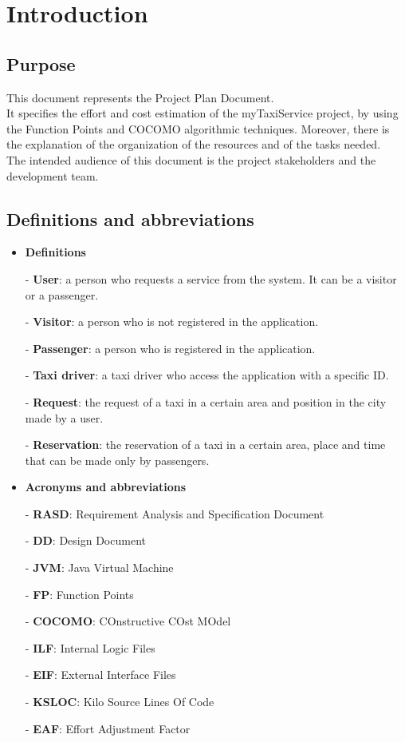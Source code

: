 \newpage
\section{Introduction}
	\subsection{Purpose}
		This document represents the Project Plan Document.\\ It specifies the effort and cost estimation of the myTaxiService project, by using the Function Points and COCOMO algorithmic techniques. Moreover, there is the explanation of the organization of the resources and of the tasks needed.\\
		The intended audience of this document is the project stakeholders and the development team.
	\subsection{Definitions and abbreviations}
		\begin{itemize}
			\item \textbf{Definitions}
			\item[-] \textbf{User}: a person who requests a service from the system. It can be a visitor or a passenger.
			\item[-] \textbf{Visitor}: a person who is not registered in the application.
			\item[-] \textbf{Passenger}: a person who is registered in the application.
			\item[-] \textbf{Taxi driver}: a taxi driver who access the application with a specific ID.
			\item[-] \textbf{Request}: the request of a taxi in a certain area and position in the city made by a user.
			\item[-] \textbf{Reservation}: the reservation of a taxi in a certain area, place and time that can be made only by passengers.
	
			\item \textbf{Acronyms and abbreviations}
			\item[-] \textbf{RASD}: Requirement Analysis and Specification Document
			\item[-] \textbf{DD}: Design Document
			\item[-] \textbf{JVM}: Java Virtual Machine
			\item[-] \textbf{FP}: Function Points
			\item[-] \textbf{COCOMO}: COnstructive COst MOdel
			\item[-] \textbf{ILF}: Internal Logic Files
			\item[-] \textbf{EIF}: External Interface Files
			\item[-] \textbf{KSLOC}: Kilo Source Lines Of Code
			\item[-] \textbf{EAF}: Effort Adjustment Factor
		\end{itemize}
	

